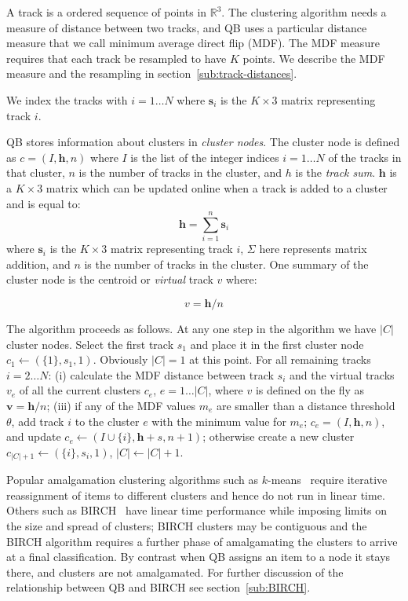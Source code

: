 \documentclass[preprint,authoryear,a4paper,10pt,onecolumn]{elsarticle}
\begin{document}
A track is a ordered sequence of points in $\mathbb{R}^{3}$.  The clustering
algorithm needs a measure of distance between two tracks, and QB uses a
particular distance measure that we call minimum average direct flip (MDF).  The
MDF measure requires that each track be resampled to have $K$ points. We
describe the MDF measure and the resampling in
section~\ref{sub:track-distances}.

We index the tracks with $i = 1 \dots N$ where $\mathbf{s}_{i}$ is the
$K\times3$ matrix representing track $i$.

QB stores information about clusters in \emph{cluster nodes}.  The cluster node
is defined as $c=(I,\mathbf{h},n)$ where $I$ is the list of the integer
indices $i = 1 \dots N$ of the tracks in that cluster, $n$ is the number of
tracks in the cluster, and $h$ is the \emph{track sum}. $\mathbf{h}$ is a $K
\times3$ matrix which can be updated online when a track is added to a cluster
and is equal to:
\begin{equation}
  \mathbf{h}=\sum_{i=1}^{n}\mathbf{s}_{i}
\end{equation} 
where $\mathbf{s}_{i}$ is the $K\times3$ matrix representing track $i$,
$\Sigma$ here represents matrix addition, and $n$ is the number of
tracks in the cluster. One summary of the cluster node is the centroid or
\emph{virtual} track $v$ where:

\begin{equation}
  v = \mathbf{h} / n
\end{equation}

The algorithm proceeds as follows.  At any one step in the algorithm we
have $|C|$ cluster nodes. Select the first track $s_{1}$ and place it in
the first cluster node $c_{1}\leftarrow(\{1\},s_{1},1)$.  Obviously $|C|
= 1$ at this point.  For all remaining tracks $i = 2 \dots N$: (i)
calculate the MDF distance between track $s_{i}$ and the virtual tracks
$v_{e}$ of all the current clusters $c_{e}$, $e = 1 \dots |C|$, where
$v$ is defined on the fly as $\mathbf{v}=\mathbf{h}/n$; (iii) if any of
the MDF values $m_{e}$ are smaller than a distance threshold $\theta$,
add track $i$ to the cluster $e$ with the minimum value for $m_{e}$;
$c_{e}=(I,\mathbf{h},n)$, and update
$c_{e}\leftarrow(I\cup\{i\},\mathbf{h}+s,n+1)$; otherwise create a new
cluster $c_{|C|+1}\leftarrow(\{i\},s_{i},1)$, $|C|\leftarrow|C|+1$.

Popular amalgamation clustering algorithms such as
$k$-means~\citep{steinhaus1956division, macqueen1967some} require
iterative reassignment of items to different clusters and hence do not
run in linear time. Others such as BIRCH~\citep{zhang1997birch} have
linear time performance while imposing limits on the size and spread of
clusters; BIRCH clusters may be contiguous and the BIRCH algorithm
requires a further phase of amalgamating the clusters to arrive at a
final classification. By contrast when QB assigns an item to a node it
stays there, and clusters are not amalgamated.
For further discussion of the relationship between QB and BIRCH see
section~\ref{sub:BIRCH}.
\end{document}

